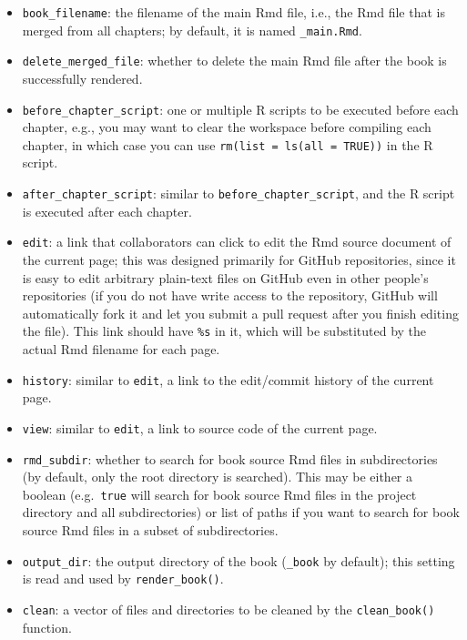 \documentclass[
  12pt,
]{krantz}
\providecommand{\tightlist}{%
  \setlength{\itemsep}{0pt}\setlength{\parskip}{0pt}}
\theoremstyle{definition}
\theoremstyle{definition}
\theoremstyle{definition}
\theoremstyle{definition}
\theoremstyle{remark}
\begin{document}
\begin{itemize}
\tightlist
\item
  \texttt{book\_filename}: the filename of the main Rmd file, i.e., the Rmd file that is merged from all chapters; by default, it is named \texttt{\_main.Rmd}.
\item
  \texttt{delete\_merged\_file}: whether to delete the main Rmd file after the book is successfully rendered.
\item
  \texttt{before\_chapter\_script}: one or multiple R scripts to be executed before each chapter, e.g., you may want to clear the workspace before compiling each chapter, in which case you can use \texttt{rm(list\ =\ ls(all\ =\ TRUE))} in the R script.
\item
  \texttt{after\_chapter\_script}: similar to \texttt{before\_chapter\_script}, and the R script is executed after each chapter.
\item
  \texttt{edit}: a link that collaborators can click to edit the Rmd source document of the current page; this was designed primarily for GitHub repositories, since it is easy to edit arbitrary plain-text files on GitHub even in other people's repositories (if you do not have write access to the repository, GitHub will automatically fork it and let you submit a pull request after you finish editing the file). This link should have \texttt{\%s} in it, which will be substituted by the actual Rmd filename for each page.
\item
  \texttt{history}: similar to \texttt{edit}, a link to the edit/commit history of the current page.
\item
  \texttt{view}: similar to \texttt{edit}, a link to source code of the current page.
\item
  \texttt{rmd\_subdir}: whether to search for book source Rmd files in subdirectories (by default, only the root directory is searched). This may be either a boolean (e.g.~\texttt{true} will search for book source Rmd files in the project directory and all subdirectories) or list of paths if you want to search for book source Rmd files in a subset of subdirectories.
\item
  \texttt{output\_dir}: the output directory of the book (\texttt{\_book} by default); this setting is read and used by \texttt{render\_book()}.
\item
  \texttt{clean}: a vector of files and directories to be cleaned by the \texttt{clean\_book()} function.
\end{itemize}
\end{document}
